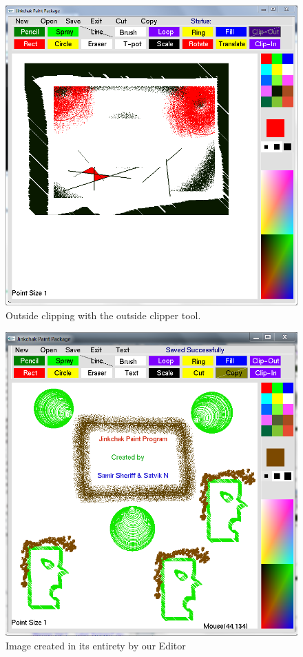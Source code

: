 \documentclass[12pt]{report}
\begin{document}
\begin{figure}[h!]
  
  \centering
    \includegraphics[scale=0.45]{screenshots/out_side_clip.png}
\caption{Outside clipping with the outside clipper tool.}
\end{figure}

\begin{figure}[h!]
  
  \centering
    \includegraphics[scale=0.9]{screenshots/CreatedBy.png}
\caption{Image created in its entirety by our Editor}
\end{figure}
\end{document}

